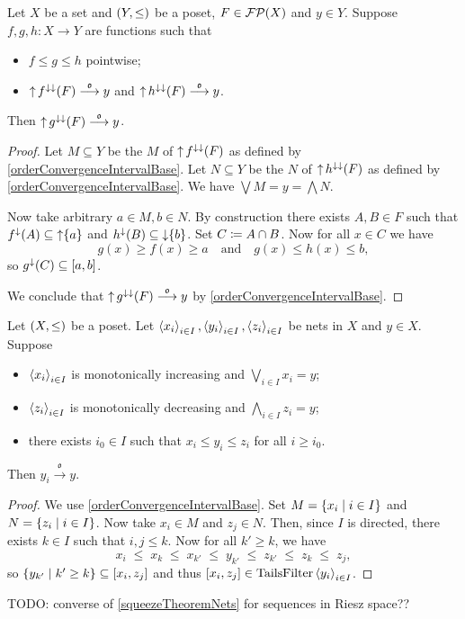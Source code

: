 \begin{proposition} \label{squeezeTheoremFilters}
Let $X$ be a set and $\sSet{Y,\leq}$ be a poset, $F\in \operatorname{\mathcal{FP}}(X)$ and $y\in Y$. Suppose $f,g,h: X\to Y$ are functions such that
\begin{itemize}
\item $f\leq g \leq h$ pointwise;
\item $\operatorname{\uparrow} f^{\downarrow\downarrow}(F) \overset{\mathfrak{o}}{\longrightarrow} y$ and $\operatorname{\uparrow} h^{\downarrow\downarrow}(F) \overset{\mathfrak{o}}{\longrightarrow} y$.
\end{itemize}
Then $\operatorname{\uparrow} g^{\downarrow\downarrow}(F) \overset{\mathfrak{o}}{\longrightarrow} y$.
\end{proposition}
\begin{proof}
Let $M\subseteq Y$ be the $M$ of $\operatorname{\uparrow} f^{\downarrow\downarrow}(F)$ as defined by \ref{orderConvergenceIntervalBase}. Let $N\subseteq Y$ be the $N$ of $\operatorname{\uparrow} h^{\downarrow\downarrow}(F)$ as defined by \ref{orderConvergenceIntervalBase}. We have $\bigvee M = y = \bigwedge N$.

Now take arbitrary $a\in M, b\in N$. By construction there exists $A,B\in F$ such that $f^\downarrow(A) \subseteq \operatorname{\uparrow} \{a\}$ and $h^\downarrow(B) \subseteq \operatorname{\downarrow} \{b\}$. Set $C\coloneqq A\cap B$. Now for all $x\in C$ we have
\[ g(x) \geq f(x) \geq a \quad\text{and}\quad g(x) \leq h(x) \leq b, \]
so $g^\imf(C) \subseteq \interval{a,b}$.

We conclude that $\operatorname{\uparrow} g^{\downarrow\downarrow}(F) \overset{\mathfrak{o}}{\longrightarrow} y$ by \ref{orderConvergenceIntervalBase}.
\end{proof}

\begin{proposition} \label{squeezeTheoremNets}
Let $\sSet{X,\leq}$ be a poset. Let $\left\langle x_i \right\rangle_{i\in I}, \left\langle y_i \right\rangle_{i\in I},\left\langle z_i \right\rangle_{i\in I}$ be nets in $X$ and $y\in X$.
Suppose
\begin{itemize}
\item $\left\langle x_i \right\rangle_{i\in I}$ is monotonically increasing and $\bigvee_{i\in I}x_i = y$;
\item $\left\langle z_i \right\rangle_{i\in I}$ is monotonically decreasing and $\bigwedge_{i\in I}z_i = y$;
\item there exists $i_0\in I$ such that $x_i \leq y_i \leq z_i$ for all $i\geq i_0$.
\end{itemize}
Then $y_i \overset{\mathfrak{o}}{\longrightarrow} y$.
\end{proposition}
\begin{proof}
We use \ref{orderConvergenceIntervalBase}. Set $M = \setbuilder{x_i}{i\in I}$ and $N = \setbuilder{z_i}{i\in I}$. Now take $x_i\in M$ and $z_j\in N$. Then, since $I$ is directed, there exists $k\in I$ such that $i,j\leq k$. Now for all $k'\geq k$, we have
\[ x_i \;\leq\; x_k \;\leq\; x_{k'} \;\leq\; y_{k'} \;\leq\; z_{k'} \;\leq\; z_k \;\leq\; z_j, \]
so $\setbuilder{y_{k'}}{k'\geq k} \subseteq \interval{x_i, z_j}$ and thus $\interval{x_i, z_j}\in\TailsFilter\seq{y_i}_{i\in I}$.
\end{proof}
TODO: converse of \ref{squeezeTheoremNets} for sequences in Riesz space??

